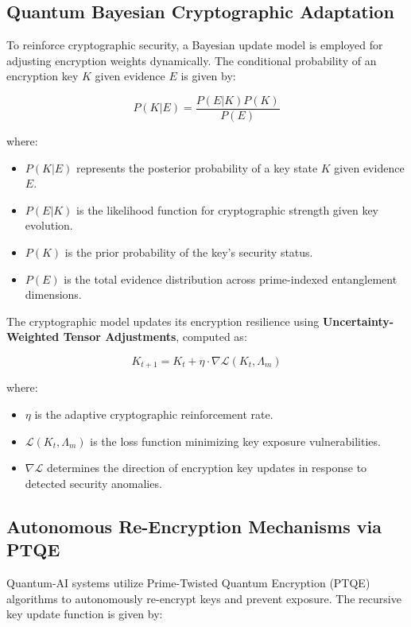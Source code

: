 \documentclass{article}
\theoremstyle{plain}
\begin{document}
\subsection{Quantum Bayesian Cryptographic Adaptation}

To reinforce cryptographic security, a Bayesian update model is employed for adjusting encryption weights dynamically. The conditional probability of an encryption key $K$ given evidence $E$ is given by:

\begin{equation}
    P(K | E) = \frac{P(E | K) P(K)}{P(E)}
\end{equation}

where:
\begin{itemize}
    \item $P(K | E)$ represents the posterior probability of a key state $K$ given evidence $E$.
    \item $P(E | K)$ is the likelihood function for cryptographic strength given key evolution.
    \item $P(K)$ is the prior probability of the key’s security status.
    \item $P(E)$ is the total evidence distribution across prime-indexed entanglement dimensions.
\end{itemize}

The cryptographic model updates its encryption resilience using \textbf{Uncertainty-Weighted Tensor Adjustments}, computed as:

\begin{equation}
    K_{t+1} = K_t + \eta \cdot \nabla \mathcal{L}(K_t, \Lambda_m)
\end{equation}

where:
\begin{itemize}
    \item $\eta$ is the adaptive cryptographic reinforcement rate.
    \item $\mathcal{L}(K_t, \Lambda_m)$ is the loss function minimizing key exposure vulnerabilities.
    \item $\nabla \mathcal{L}$ determines the direction of encryption key updates in response to detected security anomalies.
\end{itemize}

\subsection{Autonomous Re-Encryption Mechanisms via PTQE}

Quantum-AI systems utilize Prime-Twisted Quantum Encryption (PTQE) algorithms to autonomously re-encrypt keys and prevent exposure. The recursive key update function is given by:
\end{document}
